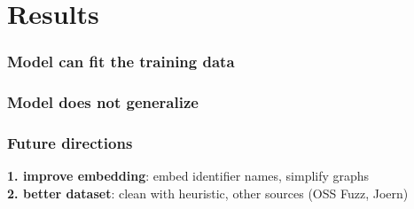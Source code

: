 \documentclass[169,xcolor=table]{beamer}
\begin{document}
\section{Results}


\begin{frame}\frametitle{Model can fit the training data}

\end{frame}

\begin{frame}\frametitle{Model does not generalize}
\end{frame}

\begin{frame}\frametitle{Future directions}
  {\bfseries 1. improve embedding}: embed identifier names, simplify graphs \\
  \vspace{4em}
  {\bfseries 2. better dataset}: clean with heuristic, other sources (OSS Fuzz, Joern)
\end{frame}
\end{document}
